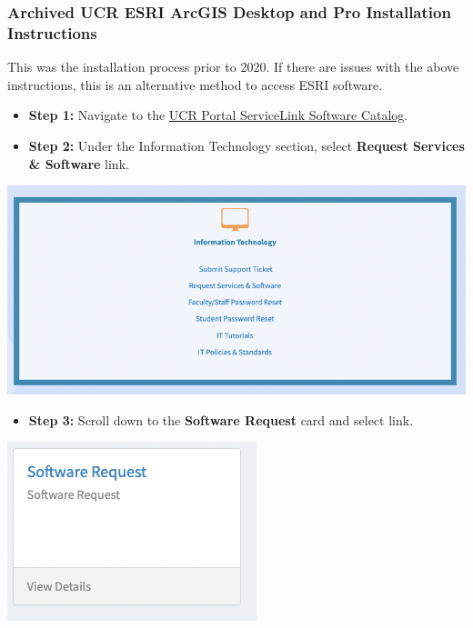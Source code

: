 \documentclass[
]{book}
\providecommand{\tightlist}{%
  \setlength{\itemsep}{0pt}\setlength{\parskip}{0pt}}
\begin{document}
\hypertarget{archived-ucr-esri-arcgis-desktop-and-pro-installation-instructions}{%
\subsubsection{Archived UCR ESRI ArcGIS Desktop and Pro Installation Instructions}\label{archived-ucr-esri-arcgis-desktop-and-pro-installation-instructions}}

This was the installation process prior to 2020. If there are issues with the above instructions, this is an alternative method to access ESRI software.

\begin{itemize}
\item
  \textbf{Step 1:} Navigate to the \href{https://ucrsupport.service-now.com/ucr_portal}{UCR Portal ServiceLink Software Catalog}.
\item
  \textbf{Step 2:} Under the Information Technology section, select \textbf{Request Services \& Software} link.
\end{itemize}

\begin{center}\includegraphics{images/ServiceLink} \end{center}

\begin{itemize}
\tightlist
\item
  \textbf{Step 3:} Scroll down to the \textbf{Software Request} card and select link.
\end{itemize}

\begin{flushleft}\includegraphics{images/softwarerequest} \end{flushleft}
\end{document}
